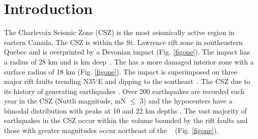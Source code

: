 \documentclass[draft]{agujournal2018}
\begin{document}
\section{Introduction}
The Charlevoix Seismic Zone (CSZ) is the most seismically active region in eastern Canada. The CSZ is within the  St. Lawrence rift zone in southeastern Quebec and is overprinted by a Devonian impact  (Fig. \ref{figone}). The impact  has a radius of 28 km and is  km deep~\citep{RONDOT1994}. The  has a more damaged interior zone with a surface radius of 18 km (Fig. \ref{figone}). The impact  is superimposed on three major rift faults trending N35$^\circ$E and dipping to the southeast~\citep{anglin1984,Rondot_1971}. The CSZ  due to its history of generating  earthquakes \citep{anglin1984,lamontagne1999}. Over 200 earthquakes are recorded each year in the CSZ (Nuttli magnitude, mN  $\leq$ 3) \citep{Baird_2010} and the hypocenters have a bimodal distribution with peaks at 10 and 22 km depths \citep{Vlahovic_2003}. The vast majority of earthquakes in the CSZ occur within the volume bounded by the rift faults \citep{Yu_2016} and those with greater magnitudes occur northeast of the ~\citep{Mazzotti_2010} (Fig. \ref{figone}).
\end{document}
